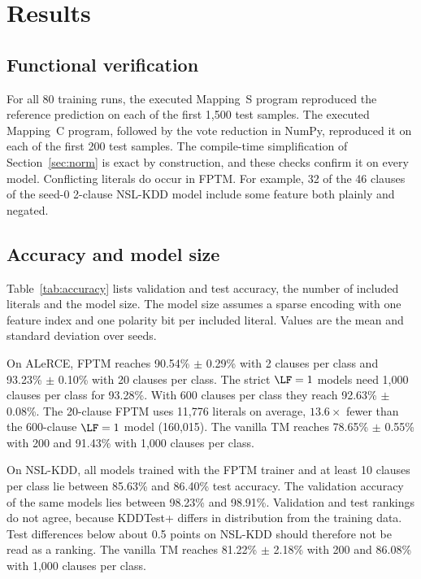 \section{Results}\label{sec:results}

\subsection{Functional verification}
For all 80 training runs, the executed Mapping~S program reproduced the reference prediction on each of the first 1,500 test samples.
The executed Mapping~C program, followed by the vote reduction in NumPy, reproduced it on each of the first 200 test samples.
The compile-time simplification of Section~\ref{sec:norm} is exact by construction, and these checks confirm it on every model.
Conflicting literals do occur in FPTM. For example, 32 of the 46 clauses of the seed-0 2-clause NSL-KDD model include some feature both plainly and negated.

\subsection{Accuracy and model size}\label{sec:accuracy}
Table~\ref{tab:accuracy} lists validation and test accuracy, the number of included literals and the model size.
The model size assumes a sparse encoding with one feature index and one polarity bit per included literal.
Values are the mean and standard deviation over seeds.

\begin{table}[!htbp]
\small
\centering
\caption{Accuracy and model size, mean $\pm$ standard deviation over seeds (Table~\ref{tab:hyper}). Test accuracy is that of the exported clause set at the epoch with the best validation accuracy. Literals: included literals over all clauses. Strict: FPTM trainer with $\LF=1$.}
\label{tab:accuracy}

\end{table}

On ALeRCE, FPTM reaches 90.54\% $\pm$ 0.29\% with 2 clauses per class and 93.23\% $\pm$ 0.10\% with 20 clauses per class.
The strict $\LF=1$ models need 1,000 clauses per class for 93.28\%. With 600 clauses per class they reach 92.63\% $\pm$ 0.08\%.
The 20-clause FPTM uses 11,776 literals on average, $13.6\times$ fewer than the 600-clause $\LF=1$ model (160,015).
The vanilla TM reaches 78.65\% $\pm$ 0.55\% with 200 and 91.43\% with 1,000 clauses per class.

On NSL-KDD, all models trained with the FPTM trainer and at least 10 clauses per class lie between 85.63\% and 86.40\% test accuracy.
The validation accuracy of the same models lies between 98.23\% and 98.91\%. Validation and test rankings do not agree, because KDDTest+ differs in distribution from the training data.
Test differences below about 0.5 points on NSL-KDD should therefore not be read as a ranking.
The vanilla TM reaches 81.22\% $\pm$ 2.18\% with 200 and 86.08\% with 1,000 clauses per class.


